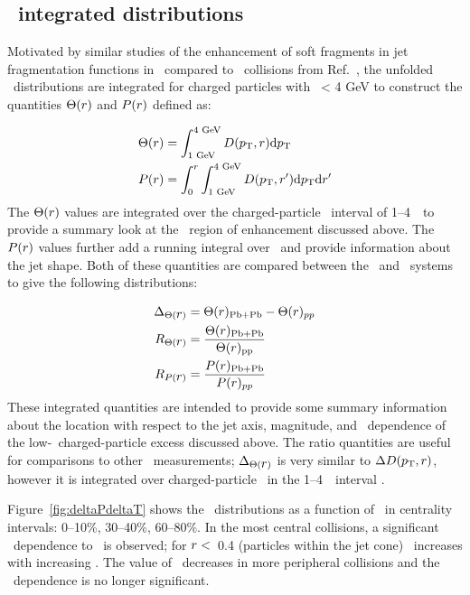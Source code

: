 \subsection{\pt\ integrated distributions}
\label{sec:discussion_int}
Motivated by similar studies of the enhancement of soft fragments in jet fragmentation functions in \pbpb\ compared to \pp\ collisions from Ref.~\cite{PhysRevC.98.024908}, the unfolded \Dptr\ distributions are integrated for charged particles with \pt\ < 4 GeV to construct the quantities $\Theta(\mbox{$r$})$ and $P(\mbox{$r$})$ defined as:

\begin{align*}
\Theta(\mbox{$r$}) &= \int_{1 \text{ GeV}}^{4 \text{ GeV}} \mbox{$D( \mbox{$p_{\mathrm{T}}$}, r)$}  \mathrm{d} \mbox{$p_{\mathrm{T}}$} \\
P(\mbox{$r$}) &= \int_0^r \int_{1 \text{ GeV}}^{4 \text{ GeV}} D(\mbox{$p_{\mathrm{T}}$}, r') \mathrm{d} \mbox{$p_{\mathrm{T}}$} \mathrm{d} r'
\end{align*}
The $\Theta(\mbox{$r$})$ values are integrated over the charged-particle \pt\ interval of 1--4~\GeV\ to provide a summary look at the \pt\ region of enhancement discussed above.
The $P(\mbox{$r$})$ values further add a running integral over \rvar\ and provide information about the jet shape.
Both of these quantities are compared between the \pp\ and \pbpb\ systems to give the following distributions:

\begin{align*}
\Delta_{\Theta(\mbox{$r$})} &= \Theta(\mbox{$r$})_{\mathrm{Pb+Pb}} - \Theta(\mbox{$r$})_{pp} \\
R_{\Theta(\mbox{$r$})} &= \frac{\Theta(\mbox{$r$})_{\mathrm{Pb+Pb}}}{\Theta(\mbox{$r$})_{\mathrm{pp}}} \\
R_{P(\mbox{$r$})} &= \frac{P(\mbox{$r$})_{\mathrm{Pb+Pb}}}{P(\mbox{$r$})_{pp}}
\end{align*}
These integrated quantities are intended to provide some summary information about the location with respect to the jet axis, magnitude, and \ptjet\ dependence of the low-\pt\ charged-particle excess discussed above.
The ratio quantities are useful for comparisons to other \pbpb\ measurements; $\Delta_{\Theta(\mbox{$r$})}$ is very similar to $\mbox{$\Delta\mbox{$D( \mbox{$p_{\mathrm{T}}$}, r)$}$}$, however it is integrated over charged-particle \pt\ in the 1--4~\GeV\ interval \cite{PhysRevC.98.024908}.

Figure~\ref{fig:deltaPdeltaT} shows the \DeltaTheta\ distributions as a function of \rvar\ in centrality intervals: 0--10\%, 30--40\%, 60--80\%.
In the most central collisions, a significant \ptjet\ dependence to \DeltaTheta\ is observed; for $\mbox{$r$} <$~0.4 (particles within the jet cone) \DeltaTheta\ increases with increasing \ptjet.
The value of \DeltaTheta\ decreases in more peripheral collisions and the \ptjet\ dependence is no longer significant.


